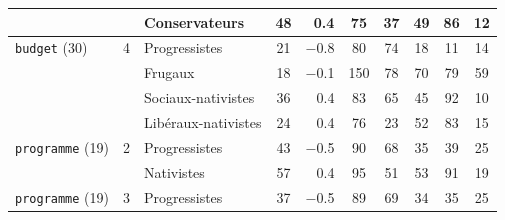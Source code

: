 {\begin{tabular}{lclcrccccc}
 &  & \cellcolor{ccdroit!15}Conservateurs & \cellcolor{ccdroit!15}48 & \cellcolor{ccdroit!15}0.4\hspace{1.5em} & \cellcolor{ccdroit!15}75 & \cellcolor{ccdroit!15}37 & \cellcolor{ccdroit!15}49 & \cellcolor{ccdroit!15}86 & \cellcolor{ccdroit!15}12 \\
\midrule
\texttt{budget} (30) & 4 & \cellcolor{cleft!15}Progressistes & \cellcolor{cleft!15}21 & \cellcolor{cleft!15}$-$0.8\hspace{1.5em} & \cellcolor{cleft!15}80 & \cellcolor{cleft!15}74 & \cellcolor{cleft!15}18 & \cellcolor{cleft!15}11 & \cellcolor{cleft!15}14 \\
 &  & \cellcolor{cfrug!15}Frugaux & \cellcolor{cfrug!15}18 & \cellcolor{cfrug!15}$-$0.1\hspace{1.5em} & \cellcolor{cfrug!15}150 & \cellcolor{cfrug!15}78 & \cellcolor{cfrug!15}70 & \cellcolor{cfrug!15}79 & \cellcolor{cfrug!15}59 \\
 &  & \cellcolor{ced!15}Sociaux-nativistes & \cellcolor{ced!15}36 & \cellcolor{ced!15}0.4\hspace{1.5em} & \cellcolor{ced!15}83 & \cellcolor{ced!15}65 & \cellcolor{ced!15}45 & \cellcolor{ced!15}92 & \cellcolor{ced!15}10 \\
 &  & \cellcolor{ccdroit!15}Libéraux-nativistes & \cellcolor{ccdroit!15}24 & \cellcolor{ccdroit!15}0.4\hspace{1.5em} & \cellcolor{ccdroit!15}76 & \cellcolor{ccdroit!15}23 & \cellcolor{ccdroit!15}52 & \cellcolor{ccdroit!15}83 & \cellcolor{ccdroit!15}15 \\
\midrule
\texttt{programme} (19) & 2 & \cellcolor{cleft!15}Progressistes & \cellcolor{cleft!15}43 & \cellcolor{cleft!15}$-$0.5\hspace{1.5em} & \cellcolor{cleft!15}90 & \cellcolor{cleft!15}68 & \cellcolor{cleft!15}35 & \cellcolor{cleft!15}39 & \cellcolor{cleft!15}25 \\
 &  & \cellcolor{ccdroit!15}Nativistes & \cellcolor{ccdroit!15}57 & \cellcolor{ccdroit!15}0.4\hspace{1.5em} & \cellcolor{ccdroit!15}95 & \cellcolor{ccdroit!15}51 & \cellcolor{ccdroit!15}53 & \cellcolor{ccdroit!15}91 & \cellcolor{ccdroit!15}19 \\
\midrule
\texttt{programme} (19) & 3 & \cellcolor{cleft!15}Progressistes & \cellcolor{cleft!15}37 & \cellcolor{cleft!15}$-$0.5\hspace{1.5em} & \cellcolor{cleft!15}89 & \cellcolor{cleft!15}69 & \cellcolor{cleft!15}34 & \cellcolor{cleft!15}35 & \cellcolor{cleft!15}25 \\

\end{tabular}}
